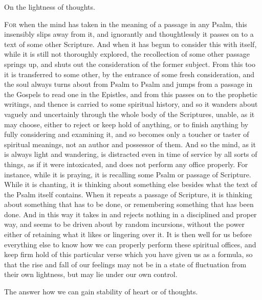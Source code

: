 
On the lightness of thoughts.

\textsc{For} when the mind has taken in the meaning of a passage in any Psalm, this insensibly slips away from it, and ignorantly and thoughtlessly it passes on to a text of some other Scripture. And when it has begun to consider this with itself, while it is still not thoroughly explored, the recollection of some other passage springs up, and shuts out the consideration of the former subject. From this too it is transferred to some other, by the entrance of some fresh consideration, and the soul always turns about from Psalm to Psalm and jumps from a passage in the Gospels to read one in the Epistles, and from this passes on to the prophetic writings, and thence is carried to some spiritual history, and so it wanders about vaguely and uncertainly through the whole body of the Scriptures, unable, as it may choose, either to reject or keep hold of anything, or to finish anything by fully considering and examining it, and so becomes only a toucher or taster of spiritual meanings, not an author and possessor of them. And so the mind, as it is always light and wandering, is distracted even in time of service by all sorts of things, as if it were intoxicated, and does not perform any office properly. For instance, while it is praying, it is recalling some Psalm or passage of Scripture. While it is chanting, it is thinking about something else besides what the text of the Psalm itself contains. When it repeats a passage of Scripture, it is thinking about something that has to be done, or remembering something that has been done. And in this way it takes in and rejects nothing in a disciplined and proper way, and seems to be driven about by random incursions, without the power either of retaining what it likes or lingering over it. It is then well for us before everything else to know how we can properly perform these spiritual offices, and keep firm hold of this particular verse which you have given us as a formula, so that the rise and fall of our feelings may not be in a state of fluctuation from their own lightness, but may lie under our own control.


The answer how we can gain stability of heart or of thoughts.

